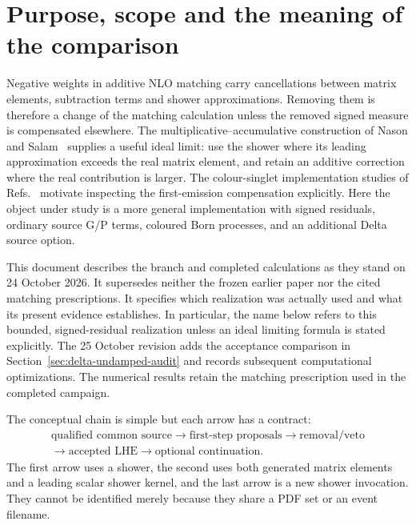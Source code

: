 \section{Purpose, scope and the meaning of the comparison}
\label{sec:introduction}

Negative weights in additive NLO matching carry cancellations between
matrix elements, subtraction terms and shower approximations. Removing
them is therefore a change of the matching calculation unless the removed
signed measure is compensated elsewhere. The multiplicative--accumulative
construction of Nason and Salam~\cite{NasonSalam} supplies a useful ideal
limit: use the shower where its leading approximation exceeds the real
matrix element, and retain an additive correction where the real
contribution is larger. The colour-singlet implementation studies of
Refs.~\cite{CheThesis,CheFrederix} motivate inspecting the first-emission
compensation explicitly. Here the object under study is a more general
implementation with signed residuals, ordinary source G/P terms, coloured
Born processes, and an additional Delta source option.

This document describes the branch and completed calculations as they
stand on 24 October 2026. It supersedes neither the frozen earlier paper
nor the cited matching prescriptions. It specifies which realization was
actually used and what its present evidence establishes. In particular,
the name \macnlops{} below refers to this bounded, signed-residual
realization unless an ideal limiting formula is stated explicitly.
The 25 October revision adds the acceptance comparison in
Section~\ref{sec:delta-undamped-audit} and records subsequent computational
optimizations. The numerical results retain the matching prescription
used in the completed campaign.

The conceptual chain is simple but each arrow has a contract:
\begin{equation}
 \begin{gathered}
 \text{qualified common source}
 \longrightarrow \text{first-step proposals}
 \longrightarrow \text{removal/veto}\\
 \longrightarrow \text{accepted LHE}
 \longrightarrow \text{optional continuation}.
 \end{gathered}
 \label{eq:workflow}
\end{equation}
The first arrow uses a shower, the second uses both generated matrix
elements and a leading scalar shower kernel, and the last arrow is a new
shower invocation. They cannot be identified merely because they share a
PDF set or an event filename.

